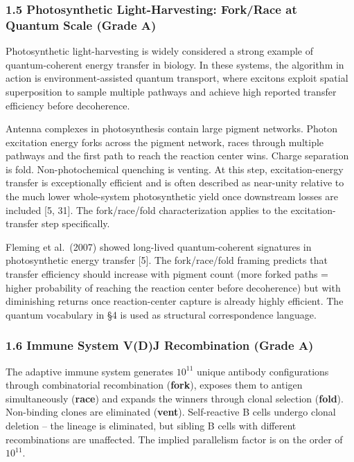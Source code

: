 \documentclass[
  11pt,
]{article}
\begin{document}
\subsubsection{1.5 Photosynthetic Light-Harvesting: Fork/Race at Quantum
Scale (Grade
A)}\label{photosynthetic-light-harvesting-forkrace-at-quantum-scale-grade-a}

Photosynthetic light-harvesting is widely considered a strong example of
quantum-coherent energy transfer in biology. In these systems, the
algorithm in action is environment-assisted quantum transport, where
excitons exploit spatial superposition to sample multiple pathways and
achieve high reported transfer efficiency before decoherence.

Antenna complexes in photosynthesis contain large pigment networks.
Photon excitation energy forks across the pigment network, races through
multiple pathways and the first path to reach the reaction center wins.
Charge separation is fold. Non-photochemical quenching is venting. At
this step, excitation-energy transfer is exceptionally efficient and is
often described as near-unity relative to the much lower whole-system
photosynthetic yield once downstream losses are included {[}5, 31{]}.
The fork/race/fold characterization applies to the excitation-transfer
step specifically.

Fleming et al.~(2007) showed long-lived quantum-coherent signatures in
photosynthetic energy transfer {[}5{]}. The fork/race/fold framing
predicts that transfer efficiency should increase with pigment count
(more forked paths = higher probability of reaching the reaction center
before decoherence) but with diminishing returns once reaction-center
capture is already highly efficient. The quantum vocabulary in §4 is
used as structural correspondence language.

\subsubsection{1.6 Immune System V(D)J Recombination (Grade
A)}\label{immune-system-vdj-recombination-grade-a}

The adaptive immune system generates \(10^{11}\) unique antibody
configurations through combinatorial recombination (\textbf{fork}),
exposes them to antigen simultaneously (\textbf{race}) and expands the
winners through clonal selection (\textbf{fold}). Non-binding clones are
eliminated (\textbf{vent}). Self-reactive B cells undergo clonal
deletion -- the lineage is eliminated, but sibling B cells with
different recombinations are unaffected. The implied parallelism factor
is on the order of \(10^{11}\).
\end{document}
